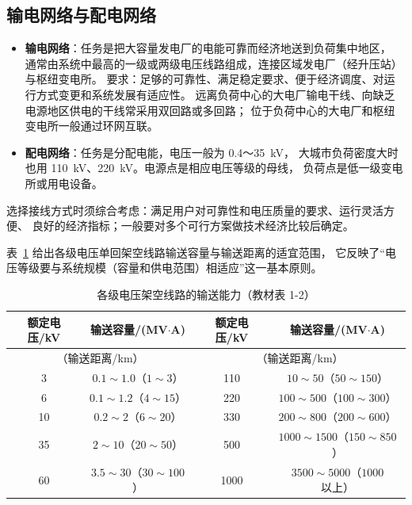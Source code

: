 \subsection{输电网络与配电网络}

\begin{itemize}
  \item \textbf{输电网络}：任务是把大容量发电厂的电能可靠而经济地送到负荷集中地区，
        通常由系统中最高的一级或两级电压线路组成，连接区域发电厂（经升压站）与枢纽变电所。
        要求：足够的可靠性、满足稳定要求、便于经济调度、对运行方式变更和系统发展有适应性。
        远离负荷中心的大电厂输电干线、向缺乏电源地区供电的干线常采用双回路或多回路；
        位于负荷中心的大电厂和枢纽变电所一般通过环网互联。
  \item \textbf{配电网络}：任务是分配电能，电压一般为 0.4～35~kV，
        大城市负荷密度大时也用 110~kV、220~kV。电源点是相应电压等级的母线，
        负荷点是低一级变电所或用电设备。
\end{itemize}

选择接线方式时须综合考虑：满足用户对可靠性和电压质量的要求、运行灵活方便、
良好的经济指标；一般要对多个可行方案做技术经济比较后确定。

表~\ref{tab:capacity} 给出各级电压单回架空线路输送容量与输送距离的适宜范围，
它反映了“电压等级要与系统规模（容量和供电范围）相适应”这一基本原则。

\begin{table}[htbp]
  \centering
  \caption{各级电压架空线路的输送能力（教材表 1-2）}
  \label{tab:capacity}
  \small
  \begin{tabular}{@{}cccc@{}}
    \toprule
    额定电压/kV & 输送容量/(MV$\cdot$A) & 额定电压/kV & 输送容量/(MV$\cdot$A) \\
    \midrule
    \multicolumn{2}{c}{（输送距离/km）} & \multicolumn{2}{c}{（输送距离/km）} \\
    3   & $0.1\sim1.0$\quad（$1\sim3$）      & 110 & $10\sim50$\quad（$50\sim150$） \\
    6   & $0.1\sim1.2$\quad（$4\sim15$）     & 220 & $100\sim500$\quad（$100\sim300$） \\
    10  & $0.2\sim2$\quad（$6\sim20$）       & 330 & $200\sim800$\quad（$200\sim600$） \\
    35  & $2\sim10$\quad（$20\sim50$）       & 500 & $1000\sim1500$\quad（$150\sim850$） \\
    60  & $3.5\sim30$\quad（$30\sim100$）    & 1000 & $3500\sim5000$\quad（$1000$ 以上） \\
    \bottomrule
  \end{tabular}
\end{table}

